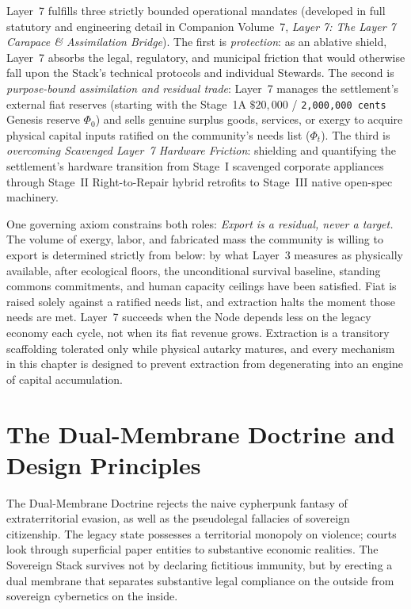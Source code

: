 Layer~7 fulfills three strictly bounded operational mandates (developed in full statutory and engineering detail in Companion Volume~7, \textit{Layer 7: The Layer 7 Carapace \& Assimilation Bridge}). The first is \textit{protection}: as an ablative shield, Layer~7 absorbs the legal, regulatory, and municipal friction that would otherwise fall upon the Stack's technical protocols and individual Stewards. The second is \textit{purpose-bound assimilation and residual trade}: Layer~7 manages the settlement's external fiat reserves (starting with the Stage~1A $\$20{,}000$ / \texttt{2,000,000 cents} Genesis reserve $\Phi_0$) and sells genuine surplus goods, services, or exergy to acquire physical capital inputs ratified on the community's needs list ($\Phi_t$). The third is \textit{overcoming Scavenged Layer~7 Hardware Friction}: shielding and quantifying the settlement's hardware transition from Stage~I scavenged corporate appliances through Stage~II Right-to-Repair hybrid retrofits to Stage~III native open-spec machinery.

One governing axiom constrains both roles: \textit{Export is a residual, never a target.} The volume of exergy, labor, and fabricated mass the community is willing to export is determined strictly from below: by what Layer~3 measures as physically available, after ecological floors, the unconditional survival baseline, standing commons commitments, and human capacity ceilings have been satisfied. Fiat is raised solely against a ratified needs list, and extraction halts the moment those needs are met. Layer~7 succeeds when the Node depends less on the legacy economy each cycle, not when its fiat revenue grows. Extraction is a transitory scaffolding tolerated only while physical autarky matures, and every mechanism in this chapter is designed to prevent extraction from degenerating into an engine of capital accumulation.

\section{The Dual-Membrane Doctrine and Design Principles}

The Dual-Membrane Doctrine rejects the naive cypherpunk fantasy of extraterritorial evasion, as well as the pseudolegal fallacies of sovereign citizenship. The legacy state possesses a territorial monopoly on violence; courts look through superficial paper entities to substantive economic realities. The Sovereign Stack survives not by declaring fictitious immunity, but by erecting a dual membrane that separates substantive legal compliance on the outside from sovereign cybernetics on the inside.

